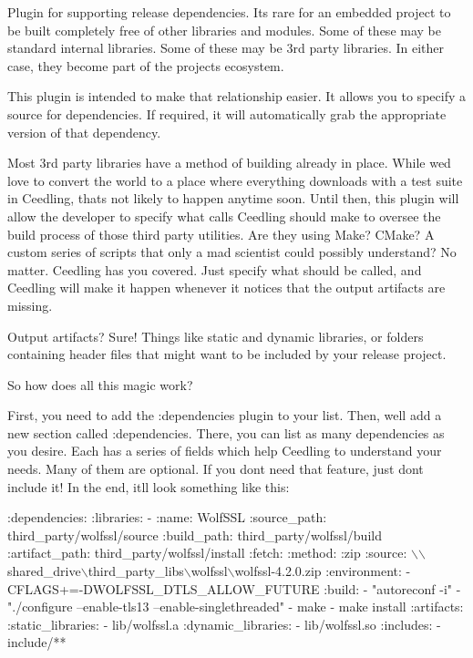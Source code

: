Plugin for supporting release dependencies. It\textquotesingle{}s rare for an embedded project to be built completely free of other libraries and modules. Some of these may be standard internal libraries. Some of these may be 3rd party libraries. In either case, they become part of the project\textquotesingle{}s ecosystem.

This plugin is intended to make that relationship easier. It allows you to specify a source for dependencies. If required, it will automatically grab the appropriate version of that dependency.

Most 3rd party libraries have a method of building already in place. While we\textquotesingle{}d love to convert the world to a place where everything downloads with a test suite in Ceedling, that\textquotesingle{}s not likely to happen anytime soon. Until then, this plugin will allow the developer to specify what calls Ceedling should make to oversee the build process of those third party utilities. Are they using Make? C\+Make? A custom series of scripts that only a mad scientist could possibly understand? No matter. Ceedling has you covered. Just specify what should be called, and Ceedling will make it happen whenever it notices that the output artifacts are missing.

Output artifacts? Sure! Things like static and dynamic libraries, or folders containing header files that might want to be included by your release project.

So how does all this magic work?

First, you need to add the {\ttfamily \+:dependencies} plugin to your list. Then, we\textquotesingle{}ll add a new section called \+:dependencies. There, you can list as many dependencies as you desire. Each has a series of fields which help Ceedling to understand your needs. Many of them are optional. If you don\textquotesingle{}t need that feature, just don\textquotesingle{}t include it! In the end, it\textquotesingle{}ll look something like this\+:


\begin{DoxyCode}
:dependencies:
  :libraries:
    - :name: WolfSSL
      :source\_path:   third\_party/wolfssl/source
      :build\_path:    third\_party/wolfssl/build
      :artifact\_path: third\_party/wolfssl/install
      :fetch:
        :method: :zip
        :source: \(\backslash\)\(\backslash\)shared\_drive\(\backslash\)third\_party\_libs\(\backslash\)wolfssl\(\backslash\)wolfssl-4.2.0.zip
      :environment:
        - CFLAGS+=-DWOLFSSL\_DTLS\_ALLOW\_FUTURE
      :build:
        - "autoreconf -i"
        - "./configure --enable-tls13 --enable-singlethreaded"
        - make
        - make install
      :artifacts:
        :static\_libraries:
          - lib/wolfssl.a
        :dynamic\_libraries:
          - lib/wolfssl.so
        :includes:
          - include/**
\end{DoxyCode}


